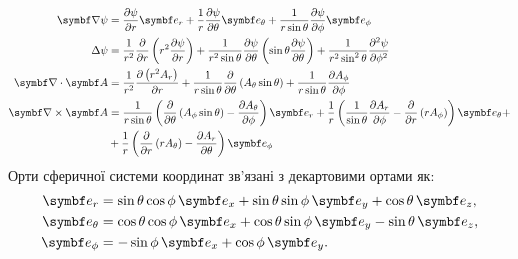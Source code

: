 \begin{align}\label{spheric}
    \vect{\nabla}\psi & = \frac{\partial \psi}{\partial r} \vect{e}_{r} + \frac{1}{r}\frac{\partial \psi}{\partial \theta} \vect{e}_{\theta} + \frac{1}{r\sin\theta}\frac{\partial \psi}{\partial \phi} \vect{e}_{\phi}                                                                                                            \\
	\Laplasian\psi    & = \frac{1}{r^2} \frac{\partial}{\partial r} \left( r^2 \frac{\partial \psi}{\partial r} \right) + \frac{1}{r^2 \sin \theta} \frac{\partial \psi}{\partial \theta} \left( \sin \theta \frac{\partial \psi}{\partial \theta} \right) + \frac{1}{r^2\sin^2 \theta} \frac{\partial^2 \psi}{\partial \phi^2} \\
	\divg\vect{A}     & =\frac{1}{r^2}\frac{\partial \left(r^2A_r\right)}{\partial r}
	+
	\frac{1}{r\sin \theta }\frac{\partial}{\partial \theta }\left(A_{\theta }\sin \theta \right)
	+
	\frac{1}{r\sin\theta}\frac{\partial A_{\phi}}{\partial \phi }                                                                                                                                                                                                                                                            \\
	\rot\vect{A}      & = \frac{1}{r\sin \theta }\left(\frac{\partial}{\partial \theta }\left(A_{\phi }\sin \theta \right)-\frac{\partial A_{\theta }}{\partial \phi }\right)\vect{e}_{r}
	+
	\frac{1}{r}\left(\frac{1}{\sin \theta }\frac{\partial A_{r}}{\partial \phi }-\frac{\partial}{\partial r}\left(rA_{\phi }\right)\right)\vect{e}_{\theta}
	+ \nonumber                                                                                                                                                                                                                                                                                                                    \\
	                  & + \frac{1}{r}\left(\frac{\partial}{\partial r}\left(rA_{\theta }\right)-\frac{\partial A_{r}}{\partial \theta }\right)\vect{e}_{\phi}
\end{align}
Орти сферичної системи координат зв'язані з декартовими ортами як:
\begin{align}\label{}
    \vect{e}_r &= \sin\theta\cos\phi\, \vect{e}_x + \sin\theta\sin\phi\, \vect{e}_y + \cos\theta\, \vect{e}_z, \\
    \vect{e}_{\theta} &= \cos\theta\cos\phi\, \vect{e}_x + \cos\theta\sin\phi\, \vect{e}_y - \sin\theta\, \vect{e}_z, \\
    \vect{e}_{\phi} &= -\sin\phi\, \vect{e}_x + \cos\phi\, \vect{e}_y. \\
\end{align}



